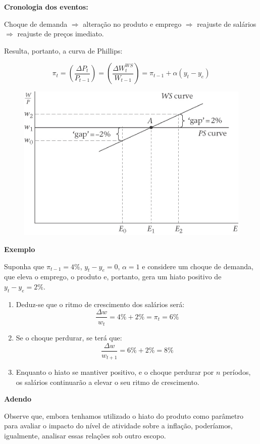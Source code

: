 \documentclass[a4paper,12pt]{article}[abntex2]
\begin{document}
\textbf{Cronologia dos eventos:}

Choque de demanda \(\Rightarrow\) alteração no produto e emprego \(\Rightarrow\) reajuste de salários \(\Rightarrow\) reajuste de preços imediato.

Resulta, portanto, a curva de Phillips:

\[
\pi_t = \left( \frac{\Delta P_t}{P_{t-1}} \right) = \left( \frac{\Delta W_t^{WS}}{W_{t-1}} \right) = \pi_{t-1} + \alpha (y_t - y_e)
\]

\begin{figure}[H]
    \centering
    \includegraphics[width=0.7\linewidth]{Imagens/a9i1.png}
\end{figure}

\textbf{Exemplo}

Suponha que \(\pi_{t-1} = 4\%\), \(y_t - y_e = 0\), \(\alpha = 1\) e considere um choque de demanda, que eleva o emprego, o produto e, portanto, gera um hiato positivo de \(y_t - y_e = 2\%\).

\begin{enumerate}
    \item Deduz-se que o ritmo de crescimento dos salários será:
    \[
    \frac{\Delta w}{w_t} = 4\% + 2\% = \pi_t = 6\%
    \]
    
    \item Se o choque perdurar, se terá que:
    \[
    \frac{\Delta w}{w_{t+1}} = 6\% + 2\% = 8\%
    \]

    \item Enquanto o hiato se mantiver positivo, e o choque perdurar por \(n\) períodos, os salários continuarão a elevar o seu ritmo de crescimento.
\end{enumerate}

\textbf{Adendo}

Observe que, embora tenhamos utilizado o hiato do produto como parâmetro para avaliar o impacto do nível de atividade sobre a inflação, poderíamos, igualmente, analisar essas relações sob outro escopo. 
\end{document}
